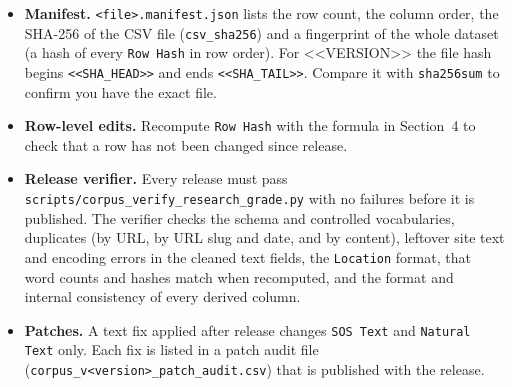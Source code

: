 \documentclass[10pt]{article}
\newcommand{\col}[1]{\texttt{#1}}
\begin{document}
\begin{itemize}
\item \textbf{Manifest.} \texttt{<file>.manifest.json} lists the row count, the column
order, the SHA-256 of the CSV file (\texttt{csv\_sha256}) and a fingerprint of the whole
dataset (a hash of every \col{Row Hash} in row order). For <<VERSION>> the file hash begins
\texttt{<<SHA_HEAD>>} and ends \texttt{<<SHA_TAIL>>}. Compare it with \texttt{sha256sum} to confirm
you have the exact file.
\item \textbf{Row-level edits.} Recompute \col{Row Hash} with the formula in Section~4 to
check that a row has not been changed since release.
\item \textbf{Release verifier.} Every release must pass
\texttt{scripts/corpus\_verify\_research\_grade.py} with no failures before it is published.
The verifier checks the schema and controlled vocabularies, duplicates (by URL, by URL slug and
date, and by content), leftover site text and encoding errors in the cleaned text fields,
the \col{Location} format, that word counts and hashes match when recomputed, and the
format and internal consistency of every derived column.
\item \textbf{Patches.} A text fix applied after release changes \col{SOS Text} and
\col{Natural Text} only. Each fix is listed in a patch audit file
(\texttt{corpus\_v<version>\_patch\_audit.csv}) that is published with the release.
\end{itemize}
\end{document}
